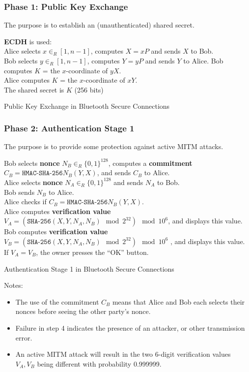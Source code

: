 \documentclass[12pt,titlepage]{article}
\begin{document}
\subsubsection{Phase 1: Public Key Exchange}
The purpose is to establish an (unauthenticated) shared secret.
\begin{algorithm}
	\textbf{ECDH} is used:\\
	Alice selects $x \in_R [1, n-1]$, computes $X = xP$ and sends $X$ to Bob.\\
	Bob selects $y \in_R [1,n-1]$, computes $Y = yP$ and sends $Y$ to Alice. Bob computes $K$ = the $x$-coordinate of $yX$.\\
	Alice computes $K$ = the $x$-coordinate of $xY$.\\
	The shared secret is $K$ (256 bits)
	\caption{Public Key Exchange in Bluetooth Secure Connections}
\end{algorithm}
\subsubsection{Phase 2: Authentication Stage 1}
The purpose is to provide some protection against active MITM attacks.
\begin{algorithm}
	Bob selects \textbf{nonce} $N_B \in_R \{0, 1\}^{128}$, computes a \textbf{commitment} $C_B = \texttt{HMAC-SHA-256} N_B (Y, X)$, and sends $C_B$ to Alice.\\
	Alice selects \textbf{nonce} $N_A \in_R \{0, 1\}^{128}$ and sends $N_A$ to Bob.\\
	Bob sends $N_B$ to Alice.\\
	Alice checks if $C_B = \texttt{HMAC-SHA-256} N_B (Y, X)$.\\
	Alice computes \textbf{verification value} $V_A = (\texttt{SHA-256}(X, Y, N_A , N_B ) \mod 2^{32} ) \mod 10^6$, and displays this value.\\
	Bob computes \textbf{verification value} $V_B = (\texttt{SHA-256}(X, Y, N_A , N_B ) \mod 2^{32} ) \mod 10^6$ , and displays this value.\\
	If $V_A = V_B$, the owner presses the ``OK'' button.
	\caption{Authentication Stage 1 in Bluetooth Secure Connections}
\end{algorithm}
Notes: \begin{itemize}
	\item The use of the commitment $C_B$ means that Alice and Bob each selects their nonces before seeing the other party’s nonce.
	\item Failure in step 4 indicates the presence of an attacker, or other transmission error.
	\item An active MITM attack will result in the two 6-digit verification values $V_A, V_B$ being different with probability 0.999999.
\end{itemize}
\end{document}

